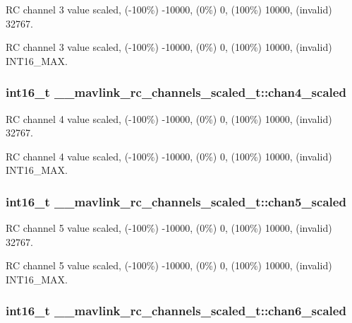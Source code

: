 R\+C channel 3 value scaled, (-\/100\%) -\/10000, (0\%) 0, (100\%) 10000, (invalid) 32767. 

R\+C channel 3 value scaled, (-\/100\%) -\/10000, (0\%) 0, (100\%) 10000, (invalid) I\+N\+T16\+\_\+\+M\+A\+X. \hypertarget{struct____mavlink__rc__channels__scaled__t_a707b8ff01d82e1ddb4aa440c60265315}{
\subsubsection[{chan4\+\_\+scaled}]{\setlength{\rightskip}{0pt plus 5cm}int16\+\_\+t \+\_\+\+\_\+mavlink\+\_\+rc\+\_\+channels\+\_\+scaled\+\_\+t\+::chan4\+\_\+scaled}}\label{struct____mavlink__rc__channels__scaled__t_a707b8ff01d82e1ddb4aa440c60265315}


R\+C channel 4 value scaled, (-\/100\%) -\/10000, (0\%) 0, (100\%) 10000, (invalid) 32767. 

R\+C channel 4 value scaled, (-\/100\%) -\/10000, (0\%) 0, (100\%) 10000, (invalid) I\+N\+T16\+\_\+\+M\+A\+X. \hypertarget{struct____mavlink__rc__channels__scaled__t_a746191bf8db147d0271f755814e62c5d}{
\subsubsection[{chan5\+\_\+scaled}]{\setlength{\rightskip}{0pt plus 5cm}int16\+\_\+t \+\_\+\+\_\+mavlink\+\_\+rc\+\_\+channels\+\_\+scaled\+\_\+t\+::chan5\+\_\+scaled}}\label{struct____mavlink__rc__channels__scaled__t_a746191bf8db147d0271f755814e62c5d}


R\+C channel 5 value scaled, (-\/100\%) -\/10000, (0\%) 0, (100\%) 10000, (invalid) 32767. 

R\+C channel 5 value scaled, (-\/100\%) -\/10000, (0\%) 0, (100\%) 10000, (invalid) I\+N\+T16\+\_\+\+M\+A\+X. \hypertarget{struct____mavlink__rc__channels__scaled__t_a0554cbaeb193f0243986c02c6396b159}{
\subsubsection[{chan6\+\_\+scaled}]{\setlength{\rightskip}{0pt plus 5cm}int16\+\_\+t \+\_\+\+\_\+mavlink\+\_\+rc\+\_\+channels\+\_\+scaled\+\_\+t\+::chan6\+\_\+scaled}}\label{struct____mavlink__rc__channels__scaled__t_a0554cbaeb193f0243986c02c6396b159}



